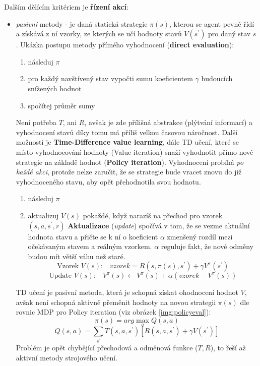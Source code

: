 Dalším dělícím kritériem je \textbf{řízení akcí}:
\begin{itemize}
\item \textit{pasivní} metody - je daná statická strategie $\pi(s)$, kterou se agent pevně řídí a získává z ní vzorky, ze kterých se učí hodnoty stavů $V(s^\prime)$ pro daný stav $s$.
\newline
Ukázka postupu metody přímého vyhodnocení (\textbf{direct evaluation}):
\begin{enumerate}
\item následuj $\pi$
\item pro každý navštívený stav vypočti sumu koeficientem $\gamma$ budoucích snížených hodnot
\item spočítej průměr sumy
\end{enumerate}
Není potřeba $T$, ani $R$, avšak je zde přílišná abstrakce (plýtvání informací) a vyhodnocení stavů díky tomu má příliš velkou časovou náročnost.
\newline
Další možností je \textbf{Time-Difference value learning}\cite{RLIntro}, dále TD učení, které se místo vyhodnocování hodnoty (Value iteration) snaží vyhodnotit přímo nové strategie na základě hodnot (\textbf{Policy iteration}). Vyhodnocení probíhá \textit{po každé akci}, protože nelze zaručit, že se strategie bude vracet znovu do již vyhodnoceného stavu, aby opět přehodnotila svou hodnotu.
\begin{enumerate}
\item následuj $\pi$
\item aktualizuj $V(s)$ pokaždé, když narazíš na přechod pro vzorek $(s,a,s^\prime,r)$
\textbf{Aktualizace} (\textit{update}) spočívá v tom, že se vezme aktuální hodnota stavu a přičte se k ní o koeficient $\alpha$ zmenšený rozdíl mezi očekávaným stavem a reálným vzorkem. $\alpha$ reguluje fakt, že nové odměny budou mít větší váhu než staré.  
\begin{displaymath}
\textrm{Vzorek $V(s)$:}\quad vzorek = R(s,\pi(s),s^\prime)+\gamma V^\pi(s^\prime)
\end{displaymath}
\begin{displaymath}
\textrm{Update $V(s)$:} \quad V^\pi(s) \leftarrow  V^\pi(s) + \alpha(vzorek - V^\pi(s))
\end{displaymath}
\end{enumerate}
TD učení je pasivní metoda, která je schopná získat ohodnocení hodnot $V$, avšak není schopná aktivně přeměnit hodnoty na novou strategii $\pi(s)$ dle rovnic MDP pro Policy iteration (viz obrázek \ref{img:policyeval}):
\begin{displaymath}
\pi(s) = arg \max_a Q(s,a)
\end{displaymath}
\begin{displaymath}
Q(s,a) = \sum_{s^\prime}T(s,a,s^\prime) \left[R(s,a,s^\prime)+\gamma V(s^\prime) \right]
\end{displaymath}
Problém je opět chybějící přechodová a odměnová funkce ($T,R$), to řeší až aktivní metody strojového učení.


\end{itemize}
